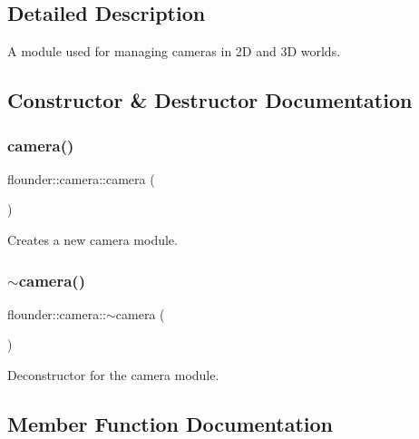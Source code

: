 \subsection{Detailed Description}
A module used for managing cameras in 2D and 3D worlds. 



\subsection{Constructor \& Destructor Documentation}
\mbox{\label{classflounder_1_1camera_a84e93f21953c21facbcddf77d83c7c47}} 
\subsubsection{\texorpdfstring{camera()}{camera()}}
{\footnotesize\ttfamily flounder\+::camera\+::camera (\begin{DoxyParamCaption}{ }\end{DoxyParamCaption})}



Creates a new camera module. 

\mbox{\label{classflounder_1_1camera_ada55d236f9f9b9a301b3fd747d15d4d0}} 
\subsubsection{\texorpdfstring{$\sim$camera()}{~camera()}}
{\footnotesize\ttfamily flounder\+::camera\+::$\sim$camera (\begin{DoxyParamCaption}{ }\end{DoxyParamCaption})}



Deconstructor for the camera module. 



\subsection{Member Function Documentation}
\mbox{\label{classflounder_1_1camera_a3ea117d355e4925fa5238bae5e6e46b1}} 
